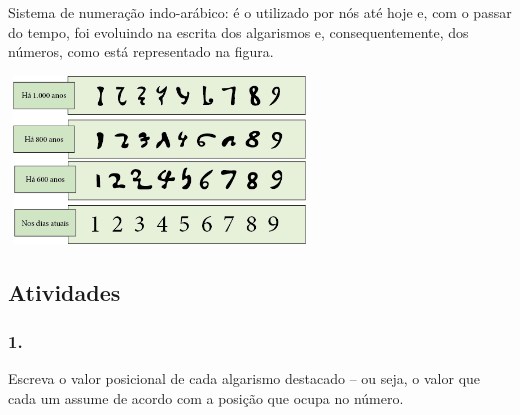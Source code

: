 Sistema de numeração indo-arábico: é o utilizado por nós
até hoje e, com o passar do tempo, foi evoluindo na escrita dos algarismos e, consequentemente, dos números, como está representado na figura.

\includegraphics[width=3.15027in,height=1.75015in]{media/image5.png}

\subsection{Atividades}\label{atividades}

\subsubsection{1.}\label{section}

Escreva o valor posicional de cada algarismo
destacado -- ou seja, o valor que cada um assume de acordo com a posição
que ocupa no número.

